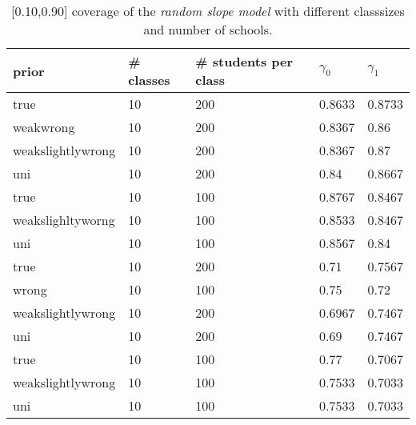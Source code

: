 \begin{table}[!ht]
\begin{center}
\begin{tabular}{l l l l  l}
prior & \# classes & \#  students per class &  $\gamma_0$ & $ \gamma_1$ \\
\hline
true & 10  &  200  &  0.8633  &  0.8733\\
weakwrong & 10  &  200  &  0.8367  &  0.86\\
weakslightlywrong & 10  &  200  &  0.8367  &  0.87\\
uni & 10  &  200  &  0.84  &  0.8667\\
true & 10  &  100  &  0.8767  &  0.8467\\
weakslighltyworng & 10  &  100  &  0.8533  &  0.8467\\
uni & 10  &  100  &  0.8567  &  0.84\\
\hline 
\hline
true & 10  &  200  &  0.71  &  0.7567\\
wrong & 10  &  100  &  0.75  &  0.72\\
weakslightlywrong& 10  &  200  &  0.6967  &  0.7467\\
uni &10  &  200  &  0.69  &  0.7467\\
\hline
true & 10  &  100  &  0.77  &  0.7067\\
weakslightlywrong & 10  &  100  &  0.7533  &  0.7033\\
uni & 10  &  100  &  0.7533  &  0.7033\\
\end{tabular}
\end{center}
\caption{ [0.10,0.90] coverage of the \emph{random slope model}  with different classsizes and number of schools. }
\label{tab:relational_table}
\end{table}


